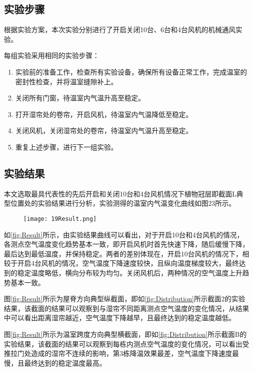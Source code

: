 	\subsection{实验步骤}
	根据实验方案，本次实验分别进行了开启关闭10台、6台和4台风机的机械通风实验。
	
每组实验采用相同的实验步骤：
	\begin{enumerate}
		\item 实验前的准备工作，检查所有实验设备，确保所有设备正常工作，完成温室的密封性检查，并将温室缝隙补上。
		\item 关闭所有门窗，待温室内气温升高至稳定。
		\item 打开湿帘处的卷帘，开启风机，待温室内气温降低至稳定。
		\item 关闭风机，关闭湿帘处的卷帘，待温室内气温升高至稳定。
		\item 重复上述步骤，进行下一组实验。
	\end{enumerate}
	
	\subsection{实验结果}
	本文选取最具代表性的先后开启和关闭10台和4台风机情况下植物冠层即截面L典型位置处的实验结果进行分析，实验测得的温室内气温变化曲线如图23所示。
		 \begin{figure}[!htp]
  			\centering
 			\texttt{[image: 19Result.png]}
		\end{figure}
	如\ref{fig:Result}所示，由实验结果曲线可以看出，对于开启10台和4台风机的情况，各测点空气温度变化趋势基本一致，即开启风机时首先快速下降，随后缓慢下降，最后达到最低温度，并保持稳定。两者的差别体现在，开启10台风机的情况下，相较于开启4台风机的情况，空气温度下降速度较快，且纵向温度梯度较大，最终达到的稳定温度略低，横向分布较为均匀。关闭风机后，两种情况的空气温度上升趋势基本一致。
	
图\ref{fig:Result}所示为屋脊方向典型纵截面，即如\ref{fig:Distribution}所示截面2的实验结果，该截面的结果可以观察到与湿帘不同距离测点空气温度的变化情况，从结果中可以看出距离湿帘越近，空气温度下降越早，且最终达到的稳定温度越低。

图\ref{fig:Result}所示为温室跨度方向典型横截面，即如\ref{fig:Distribution}所示截面B的实验结果，该截面的结果可以观察到每栋内测点空气温度的变化情况，可以看出受推拉门处造成的湿帘不连续的影响，第3栋降温效果最差，空气温度下降速度最慢，且最终达到的稳定温度最高。

